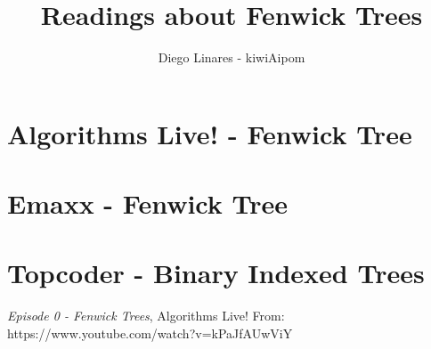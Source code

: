 \documentclass{IEEEtran}
\title{Readings about Fenwick Trees}
\author{Diego Linares - kiwiAipom}
\begin{document}
  \maketitle
  \section{Algorithms Live! - Fenwick Tree}
  \section{Emaxx - Fenwick Tree}
  \section{Topcoder - Binary Indexed Trees}
  \begin{thebibliography}{}
      \textit{Episode 0 - Fenwick Trees},
      Algorithms Live!
      From: https://www.youtube.com/watch?v=kPaJfAUwViY
  \end{thebibliography}
\end{document}
